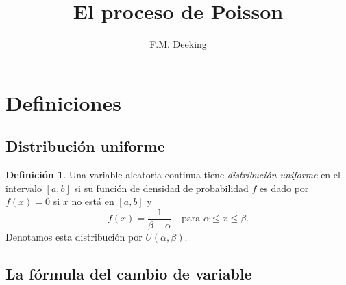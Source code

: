 \documentclass[10pt,twoside=false,twocolumn=false,BCOR=12mm,DIV=calc]{scrartcl} %
\theoremstyle{definition}
\newtheorem{definition}[section]{Definición}
\begin{document}
\begin{titlepage}
	\extratitle{
		\textbf{\LARGE Traducción del libro
		\\[\baselineskip]
		\textit{Una moderna introducción a la\linebreak Estadística y la Probabilidad}
		\\[\baselineskip]
		Entendiendo por qué y cómo}
	}
	\title{El proceso de Poisson}
	\author{F.M. Deeking}
	\begin{spacing}{1}
		\maketitle
	\end{spacing}
	\thispagestyle{empty}
\end{titlepage}

\section{Definiciones}
\label{sec:defi}


\subsection{Distribución uniforme}

\begin{definition}
  Una variable aleatoria continua tiene \textit{distribución uniforme} en el intervalo $\left[a,b\right]$ si su función de densidad de probabilidad $f$ es dado por $f(x)=0$ si $x$ no está en $\left[a,b\right]$ y
  \begin{equation*}
    f(x)=\frac{1}{\beta-\alpha}\quad\text{para }\alpha \le x\le \beta.
  \end{equation*}
 Denotamos esta distribución por $U\left(\alpha,\beta\right)$.
\end{definition}

\subsection{La fórmula del cambio de variable}
\label{sec:change}
\end{document}
